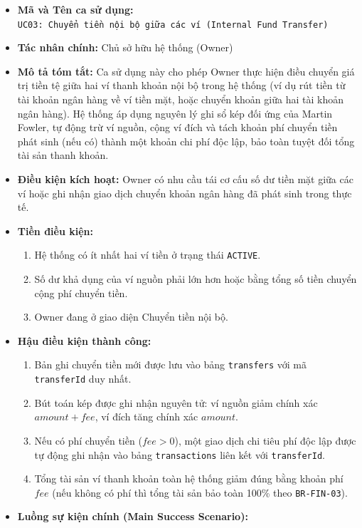 \documentclass[11pt,a4paper]{article}
\providecommand{\tightlist}{
  \setlength{\itemsep}{0pt}\setlength{\parskip}{0pt}}
\begin{document}
\begin{itemize}
\tightlist
\item
  \textbf{Mã và Tên ca sử dụng:}
  \texttt{UC03:\ Chuyển\ tiền\ nội\ bộ\ giữa\ các\ ví\ (Internal\ Fund\ Transfer)}
\item
  \textbf{Tác nhân chính:} Chủ sở hữu hệ thống (Owner)
\item
  \textbf{Mô tả tóm tắt:} Ca sử dụng này cho phép Owner thực hiện điều
  chuyển giá trị tiền tệ giữa hai ví thanh khoản nội bộ trong hệ thống
  (ví dụ rút tiền từ tài khoản ngân hàng về ví tiền mặt, hoặc chuyển
  khoản giữa hai tài khoản ngân hàng). Hệ thống áp dụng nguyên lý ghi sổ
  kép đối ứng của Martin Fowler, tự động trừ ví nguồn, cộng ví đích và
  tách khoản phí chuyển tiền phát sinh (nếu có) thành một khoản chi phí
  độc lập, bảo toàn tuyệt đối tổng tài sản thanh khoản.
\item
  \textbf{Điều kiện kích hoạt:} Owner có nhu cầu tái cơ cấu số dư tiền
  mặt giữa các ví hoặc ghi nhận giao dịch chuyển khoản ngân hàng đã phát
  sinh trong thực tế.
\item
  \textbf{Tiền điều kiện:}

  \begin{enumerate}
  \def\labelenumi{\arabic{enumi}.}
  \tightlist
  \item
    Hệ thống có ít nhất hai ví tiền ở trạng thái \texttt{ACTIVE}.
  \item
    Số dư khả dụng của ví nguồn phải lớn hơn hoặc bằng tổng số tiền
    chuyển cộng phí chuyển tiền.
  \item
    Owner đang ở giao diện Chuyển tiền nội bộ.
  \end{enumerate}
\item
  \textbf{Hậu điều kiện thành công:}

  \begin{enumerate}
  \def\labelenumi{\arabic{enumi}.}
  \tightlist
  \item
    Bản ghi chuyển tiền mới được lưu vào bảng \texttt{transfers} với mã
    \texttt{transferId} duy nhất.
  \item
    Bút toán kép được ghi nhận nguyên tử: ví nguồn giảm chính xác
    \(amount + fee\), ví đích tăng chính xác \(amount\).
  \item
    Nếu có phí chuyển tiền (\(fee > 0\)), một giao dịch chi tiêu phí độc
    lập được tự động ghi nhận vào bảng \texttt{transactions} liên kết
    với \texttt{transferId}.
  \item
    Tổng tài sản ví thanh khoản toàn hệ thống giảm đúng bằng khoản phí
    \(fee\) (nếu không có phí thì tổng tài sản bảo toàn 100\% theo
    \texttt{BR-FIN-03}).
  \end{enumerate}
\item
  \textbf{Luồng sự kiện chính (Main Success Scenario):}


\end{itemize}
\end{document}
